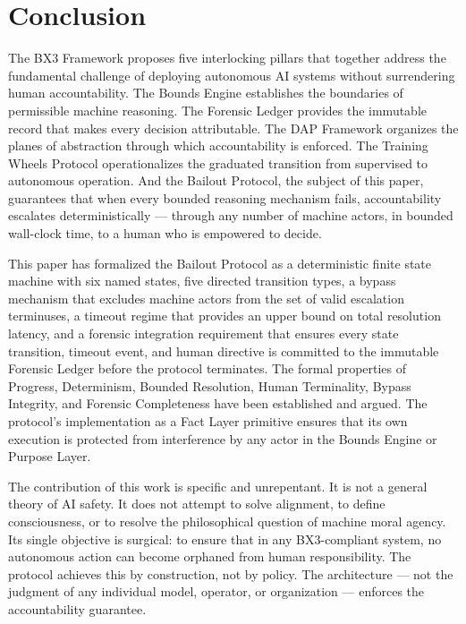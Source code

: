 \section{Conclusion}
\label{sec:conclusion}

The BX3 Framework proposes five interlocking pillars that together address the fundamental challenge of deploying autonomous AI systems without surrendering human accountability. The Bounds Engine establishes the boundaries of permissible machine reasoning. The Forensic Ledger provides the immutable record that makes every decision attributable. The DAP Framework organizes the planes of abstraction through which accountability is enforced. The Training Wheels Protocol operationalizes the graduated transition from supervised to autonomous operation. And the Bailout Protocol, the subject of this paper, guarantees that when every bounded reasoning mechanism fails, accountability escalates deterministically — through any number of machine actors, in bounded wall-clock time, to a human who is empowered to decide.

This paper has formalized the Bailout Protocol as a deterministic finite state machine with six named states, five directed transition types, a bypass mechanism that excludes machine actors from the set of valid escalation terminuses, a timeout regime that provides an upper bound on total resolution latency, and a forensic integration requirement that ensures every state transition, timeout event, and human directive is committed to the immutable Forensic Ledger before the protocol terminates. The formal properties of Progress, Determinism, Bounded Resolution, Human Terminality, Bypass Integrity, and Forensic Completeness have been established and argued. The protocol's implementation as a Fact Layer primitive ensures that its own execution is protected from interference by any actor in the Bounds Engine or Purpose Layer.

The contribution of this work is specific and unrepentant. It is not a general theory of AI safety. It does not attempt to solve alignment, to define consciousness, or to resolve the philosophical question of machine moral agency. Its single objective is surgical: to ensure that in any BX3-compliant system, no autonomous action can become orphaned from human responsibility. The protocol achieves this by construction, not by policy. The architecture — not the judgment of any individual model, operator, or organization — enforces the accountability guarantee.


